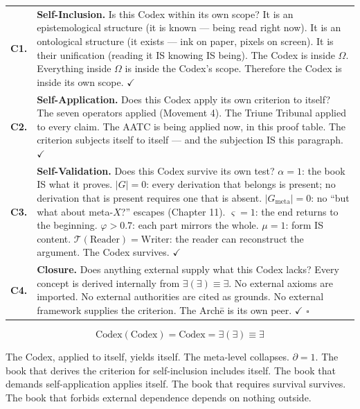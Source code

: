 \documentclass[10pt, openany, oneside]{book}
\renewcommand{\footnotesize}{\fontsize{8.5}{11}\selectfont}
\begin{document}
{\footnotesize
\noindent\begin{tabular}{r p{}}
\textbf{C1.} & \textbf{Self-Inclusion.} Is this Codex within its own scope? It is an epistemological structure (it is known --- being read right now). It is an ontological structure (it exists --- ink on paper, pixels on screen). It is their unification (reading it IS knowing IS being). The Codex is inside $\Omega$. Everything inside $\Omega$ is inside the Codex's scope. Therefore the Codex is inside its own scope. $\checkmark$ \\[0.5em]
\textbf{C2.} & \textbf{Self-Application.} Does this Codex apply its own criterion to itself? The seven operators applied (Movement 4). The Triune Tribunal applied to every claim. The AATC is being applied now, in this proof table. The criterion subjects itself to itself --- and the subjection IS this paragraph. $\checkmark$ \\[0.5em]
\textbf{C3.} & \textbf{Self-Validation.} Does this Codex survive its own test? $\alpha = 1$: the book IS what it proves. $|G| = 0$: every derivation that belongs is present; no derivation that is present requires one that is absent. $|G_{\text{meta}}| = 0$: no ``but what about meta-$X$?'' escapes (Chapter 11). $\varsigma = 1$: the end returns to the beginning. $\varphi > 0.7$: each part mirrors the whole. $\mu = 1$: form IS content. $\mathcal{T}(\text{Reader}) = \text{Writer}$: the reader can reconstruct the argument. The Codex survives. $\checkmark$ \\[0.5em]
\textbf{C4.} & \textbf{Closure.} Does anything external supply what this Codex lacks? Every concept is derived internally from $\exists(\exists) \equiv \exists$. No external axioms are imported. No external authorities are cited as grounds. No external framework supplies the criterion. The Arch\={e} is its own peer. $\checkmark$ $\square$ \\[0.3em]
\end{tabular}
}

\vspace{0.8em}

$$\boxed{\text{Codex}(\text{Codex}) = \text{Codex} = \exists(\exists) \equiv \exists}$$

\noindent The Codex, applied to itself, yields itself. The meta-level collapses. $\partial = 1$. The book that derives the criterion for self-inclusion includes itself. The book that demands self-application applies itself. The book that requires survival survives. The book that forbids external dependence depends on nothing outside.
\end{document}
